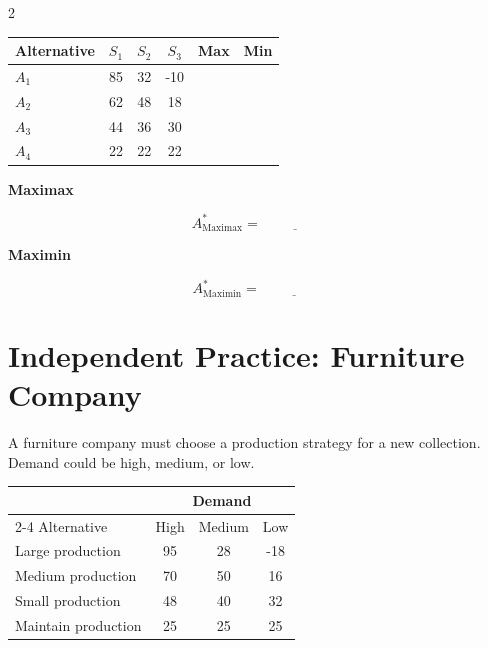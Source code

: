 \begin{multicols}{2}
		\begin{center}
			\renewcommand{\arraystretch}{1.5}
			\small
			\begin{tabular}{lccccc}
				\toprule
				Alternative & $S_1$ & $S_2$ & $S_3$ & Max & Min \\
				\midrule
				$A_1$ & 85 & 32 & -10 &
				\underline{\hspace{1.1cm}} &
				\underline{\hspace{1.1cm}}\\[3pt]
				$A_2$ & 62 & 48 & 18 &
				\underline{\hspace{1.1cm}} &
				\underline{\hspace{1.1cm}}\\[3pt]
				$A_3$ & 44 & 36 & 30 &
				\underline{\hspace{1.1cm}} &
				\underline{\hspace{1.1cm}}\\[3pt]
				$A_4$ & 22 & 22 & 22 &
				\underline{\hspace{1.1cm}} &
				\underline{\hspace{1.1cm}}\\
				\bottomrule
			\end{tabular}
		\end{center}
		
		\textbf{Maximax}
		
		\[
		A^*_{\mathrm{Maximax}}
		=\underline{\hspace{2cm}}
		\]
		
		\textbf{Maximin}
		
		\[
		A^*_{\mathrm{Maximin}}
		=\underline{\hspace{2cm}}
		\]
		
		
		\section{Independent Practice: Furniture Company}
		
		A furniture company must choose a production strategy for a new collection.
		Demand could be high, medium, or low.
		
		\begin{center}
			\renewcommand{\arraystretch}{1.3}
			\small
			\begin{tabular}{lccc}
				\toprule
				& \multicolumn{3}{c}{Demand} \\
				\cmidrule(lr){2-4}
				Alternative & High & Medium & Low \\
				\midrule
				Large production  & 95 & 28 & -18 \\
				Medium production & 70 & 50 & 16 \\
				Small production  & 48 & 40 & 32 \\
				Maintain production & 25 & 25 & 25 \\
				\bottomrule
			\end{tabular}
		\end{center}

\end{multicols}
